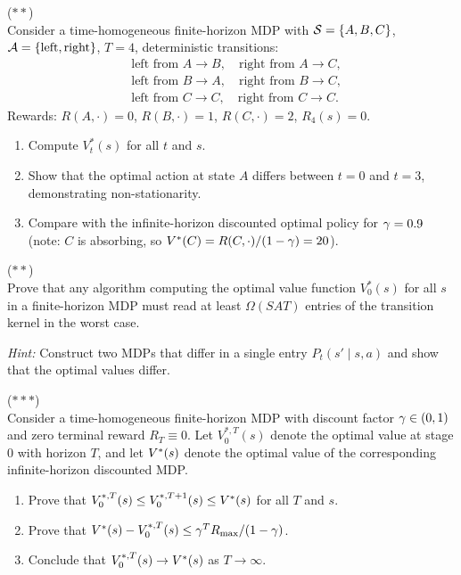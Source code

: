 \documentclass[11pt,a4paper]{article}
\begin{document}
\begin{exercise}
\textnormal{(\(**\))} \\
Consider a time-homogeneous finite-horizon MDP with $\mathcal{S} = \{A,
B, C\}$, $\mathcal{A} = \{\text{left}, \text{right}\}$, $T = 4$,
deterministic transitions:
\begin{align*}
    &\text{left from } A \to B, \quad \text{right from } A \to C, \\
    &\text{left from } B \to A, \quad \text{right from } B \to C, \\
    &\text{left from } C \to C, \quad \text{right from } C \to C.
\end{align*}
Rewards: $R(A, \cdot) = 0$, $R(B, \cdot) = 1$, $R(C, \cdot) = 2$,
$R_4(s) = 0$.
\begin{enumerate}[label=(\alph*)]
    \item Compute $V_t^*(s)$ for all $t$ and $s$.
    \item Show that the optimal action at state $A$ differs between
    $t = 0$ and $t = 3$, demonstrating non-stationarity.
    \item Compare with the infinite-horizon discounted optimal policy
    for $\gamma = 0.9$ (note: $C$ is absorbing, so
    $V^*(C) = R(C,\cdot)/(1-\gamma) = 20$).
\end{enumerate}
\end{exercise}

\begin{exercise} \textnormal{(\(**\))} \\
Prove that any algorithm computing the optimal value function
$V_0^*(s)$ for all $s$ in a finite-horizon MDP must read at least
$\Omega(S A T)$ entries of the transition kernel in the worst case.

\textit{Hint:} Construct two MDPs that differ in a single entry
$P_t(s' \mid s, a)$ and show that the optimal values differ.
\end{exercise}

\begin{exercise}
\textnormal{(\(***\))} \\
Consider a time-homogeneous finite-horizon MDP with discount factor
$\gamma \in (0,1)$ and zero terminal reward $R_T \equiv 0$. Let
$V_0^{*,T}(s)$ denote the optimal value at stage $0$ with horizon
$T$, and let $V^*(s)$ denote the optimal value of the
corresponding infinite-horizon discounted MDP.
\begin{enumerate}[label=(\alph*)]
    \item Prove that $V_0^{*,T}(s) \leq V_0^{*,T+1}(s) \leq
    V^*(s)$ for all $T$ and $s$.
    \item Prove that $V^*(s) - V_0^{*,T}(s) \leq \gamma^T
    R_{\max} / (1 - \gamma)$.
    \item Conclude that $V_0^{*,T}(s) \to V^*(s)$ as
    $T \to \infty$.
\end{enumerate}
\end{exercise}
\end{document}
